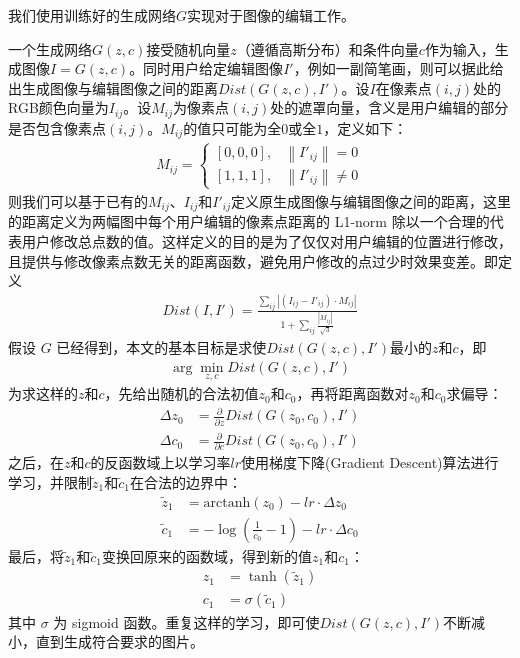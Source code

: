 \documentclass[a4paper,12pt,UTF8]{ctexart}
\newcommand{\norm}[1]{\left\lVert#1\right\rVert}
\begin{document}
我们使用训练好的生成网络$G$实现对于图像的编辑工作。

一个生成网络$G(z, c)$接受随机向量$z$（遵循高斯分布）和条件向量$c$作为输入，生成图像$I = G(z, c)$。同时用户给定编辑图像$I'$，例如一副简笔画，则可以据此给出生成图像与编辑图像之间的距离$Dist(G(z, c), I')$。设$I$在像素点$(i, j)$处的RGB颜色向量为$I_{ij}$。设$M_{ij}$为像素点$(i, j)$处的遮罩向量，含义是用户编辑的部分是否包含像素点$(i, j)$。$M_{ij}$的值只可能为全$0$或全$1$，定义如下：
%
\begin{align}
  M_{ij} =
  \begin{cases}
    [0, 0, 0],   &  \text{$\norm{I'_{ij}} = 0$} \\
    [1, 1, 1],   &  \text{$\norm{I'_{ij}} \neq 0$}
  \end{cases}
\end{align}
%
则我们可以基于已有的$M_{ij}$、$I_{ij}$和$I'_{ij}$定义原生成图像与编辑图像之间的距离，这里的距离定义为两幅图中每个用户编辑的像素点距离的 L1-norm 除以一个合理的代表用户修改总点数的值。这样定义的目的是为了仅仅对用户编辑的位置进行修改，且提供与修改像素点数无关的距离函数，避免用户修改的点过少时效果变差。即定义
%
\begin{align}
  Dist(I, I') = \frac{\sum_{ij} |(I_{ij} - I'_{ij}) \cdot M_{ij}|}{1 + \sum_{ij} \frac{|M_{ij}|}{\sqrt 3}}
\end{align}
%
假设 $G$ 已经得到，本文的基本目标是求使$Dist(G(z, c), I')$最小的$z$和$c$，即
%
\begin{align}
  \arg\min_{z, c} Dist(G(z, c), I')
\end{align}
%
为求这样的$z$和$c$，先给出随机的合法初值$z_{0}$和$c_{0}$，再将距离函数对$z_{0}$和$c_{0}$求偏导：
%
\begin{align}
  \Delta z_{0} & = \frac{\partial}{\partial z} Dist(G(z_{0}, c_{0}), I') \\
  \Delta c_{0} & = \frac{\partial}{\partial c} Dist(G(z_{0}, c_{0}), I')
\end{align}
%
之后，在$z$和$c$的反函数域上以学习率$lr$使用梯度下降(Gradient Descent)算法进行学习，并限制$\tilde z_{1}$和$\tilde c_{1}$在合法的边界中：
%
\begin{align}
  \tilde z_{1} & = \mathrm{arctanh}(z_{0}) - lr \cdot \Delta z_{0} \\
  \tilde c_{1} & = - \log \left(\frac{1}{c_{0}} - 1\right) - lr \cdot \Delta c_{0}
\end{align}
%
最后，将$\tilde z_{1}$和$\tilde c_{1}$变换回原来的函数域，得到新的值$z_{1}$和$c_{1}$：
%
\begin{align}
  z_{1} & = \tanh (\tilde z_{1}) \\
  c_{1} & = \sigma(\tilde c_{1})
\end{align}
%
其中 $\sigma$ 为 sigmoid 函数。重复这样的学习，即可使$Dist(G(z, c), I')$不断减小，直到生成符合要求的图片。
\end{document}
